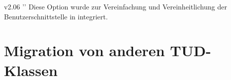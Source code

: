 \begin{Obsolete}{v2.06}{}%
  ''
\printdeclarationlist%
%
Diese Option wurde zur Vereinfachung und Vereinheitlichung der 
Benutzerschnittstelle in  integriert.
\end{Obsolete}



\section[%
  Das Paket \PackageRaw{tudscrcomp}{\BooleanFalse}
  -- Migration von anderen TUD-Klassen%
]{%
  Migration von anderen TUD-Klassen%
}
